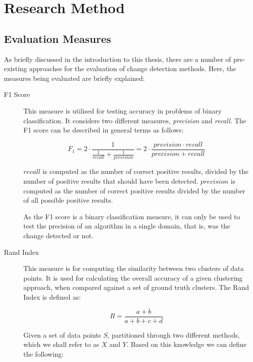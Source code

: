 \documentclass{uvamscse}	%
\begin{document}
\chapter{Research Method}
\label{Research Method}

\section{Evaluation Measures}

As briefly discussed in the introduction to this thesis, there are a number of pre-existing approaches for the evaluation of change detection methods. Here, the measures being evaluated are briefly explained:

\begin{description}
	\item[F1 Score] This measure is utilised for testing accuracy in problems of binary classification. It considers two different measures, \emph{precision} and \emph{recall}. The F1 score can be described in general terms as follows:

	\begin{equation}
		F_1 = 2 \cdot \frac{1}{\frac{1}{recall} + \frac{1}{precision}} = 2 \cdot \frac{precision \cdot recall}{precision+recall}
		\label{equ:F1}
	\end{equation}

	$recall$ is computed as the number of correct positive results, divided by the number of positive results that should have been detected. $precision$ is computed as the number of correct positive results divided by the number of all possible positive results.

	As the F1 score is a binary classification measure, it can only be used to test the precision of an algorithm in a single domain, that is, was the change detected or not.

	\item[Rand Index] This measure is for computing the similarity between two clusters of data points. It is used for calculating the overall accuracy of a given clustering approach, when compared against a set of ground truth clusters. The Rand Index is defined as:

	\begin{equation}
		R = \frac{a+b}{a+b+c+d}
	\end{equation}
	
	Given a set of data points $S$, partitioned through two different methods, which we shall refer to as $X$ and $Y$. Based on this knowledge we can define the following:
	

\end{description}
\end{document}
